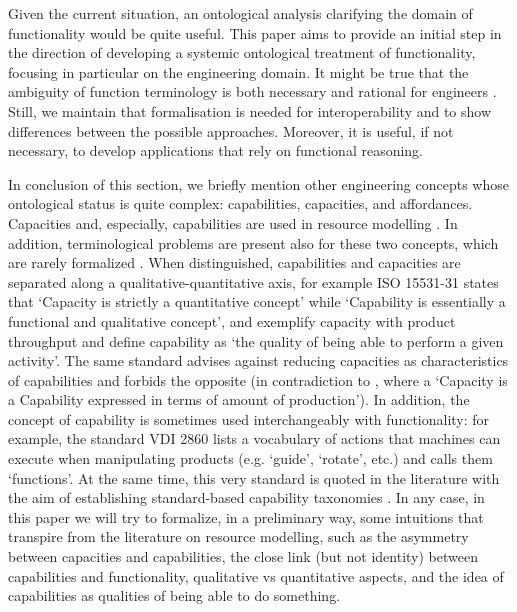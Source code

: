 \documentclass[sw]{iosart2x}
\newcommand{\quotes}[1]{`#1'}
\begin{document}
Given the current situation, an ontological analysis clarifying the domain of functionality would be quite useful.
This paper aims to provide an initial step in the direction of developing a systemic ontological treatment of functionality, focusing in particular on the engineering domain.
It might be true that the ambiguity of function terminology is both necessary and rational for engineers \cite{vermaasConceptualElusivenessEngineering2012}. 
Still, we maintain that formalisation is needed for interoperability and to show differences between the possible approaches. Moreover, it is useful, if not necessary, to develop applications that rely on functional reasoning.

\medskip
In conclusion of this section, we briefly mention other engineering concepts whose ontological status is quite complex: capabilities, capacities, and affordances. 
Capacities and, especially, capabilities are used in resource modelling \cite{jarvenpaaDevelopmentOntologyDescribing2019a, sarkarOntologyModelProcess2019, jochemISOISO15531312004, solanoKnowledgeRepresentationProduct2014, sanfilippoOntologicalModelingManufacturing2021}. In addition, terminological problems are present also for these two concepts, which are rarely formalized \cite{sanfilippoResourcesManufacturing2015, borgoCapabilitiesCapacitiesFunctionalities2021}. When distinguished, capabilities and capacities are separated along a qualitative-quantitative axis, for example ISO 15531-31\cite{jochemISOISO15531312004} states that \quotes{Capacity is strictly a quantitative concept} while \quotes{Capability is essentially a functional and qualitative concept}, and exemplify capacity with product throughput and define capability as \quotes{the quality of being able to perform a given activity}. The same standard advises against reducing capacities as characteristics of capabilities and forbids the opposite (in contradiction to \cite{solanoKnowledgeRepresentationProduct2014}, where a \quotes{Capacity is a Capability
expressed in terms of amount of production}). 
In addition, the concept of capability is sometimes used interchangeably with functionality: for example, the standard VDI 2860 \cite{VDI2860Assembly1990} lists a vocabulary of actions that machines can execute when manipulating products (e.g. `guide', `rotate', etc.) and calls them `functions'. At the same time, this very standard is quoted in the literature with the aim of establishing standard-based capability taxonomies \cite{kocherFormalCapabilitySkill2020a, kocherReferenceModelCommon2022}.
In any case, in this paper we will try to formalize, in a preliminary way, some intuitions that transpire from the literature on resource modelling, such as the asymmetry between capacities and capabilities, the close link (but not identity) between capabilities and functionality, qualitative vs quantitative aspects, and the idea of capabilities as qualities of being able to do something.
\end{document}
